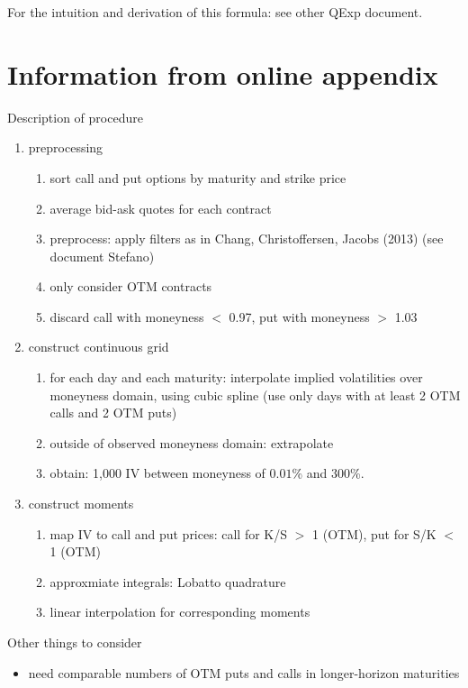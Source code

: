 \documentclass{article}
\begin{document}
For the intuition and derivation of this formula: see other QExp document.


\section{Information from online appendix}\label{sec:2}

Description of procedure
\begin{enumerate}
\item preprocessing
\begin{enumerate}
	\item sort call and put options by maturity and strike price
	\item average bid-ask quotes for each contract
	\item preprocess: apply filters as in Chang, Christoffersen, Jacobs (2013) (see document Stefano)
	\item only consider OTM contracts
	\item discard call with moneyness $<$ 0.97, put with moneyness $>$ 1.03
\end{enumerate}
\item construct continuous grid 
\begin{enumerate}
	\item for each day and each maturity: interpolate implied volatilities over moneyness domain, using cubic spline (use only days with at least 2 OTM calls and 2 OTM puts)
	\item outside of observed moneyness domain: extrapolate
	\item obtain: 1,000 IV between moneyness of $0.01$\% and $300$\%.
\end{enumerate}
\item construct moments
\begin{enumerate}
	\item map IV to call and put prices: call for K/S $>$ 1 (OTM), put for S/K $<$ 1 (OTM)
	\item approxmiate integrals: Lobatto quadrature
	\item linear interpolation for corresponding moments
\end{enumerate}
\end{enumerate}

Other things to consider
\begin{itemize}
\item need comparable numbers of OTM puts and calls in longer-horizon maturities
\end{itemize}
\end{document}
